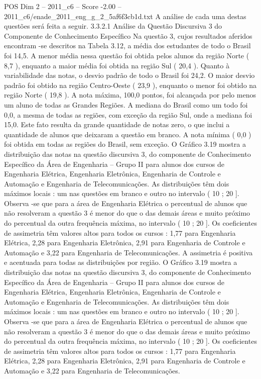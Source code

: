 \begin{textsample}{POS Dim 2 – 2011\_c6 – Score -2.00 – 2011\_c6/enade\_2011\_eng\_g\_2\_5af6f3cb1d.txt}
A análise de cada uma destas questões será feita a seguir. 3.3.2.1 Análise da Questão Discursiva 3 do Componente de Conhecimento Específico Na questão 3, cujos resultados aferidos encontram -se descritos na Tabela 3.12, a média dos estudantes de todo o Brasil foi 14,5.
A menor média nessa questão foi obtida pelos alunos da região Norte ( 8,7 ), enquanto a maior média foi obtida na região Sul ( 20,4 ).
Quanto à variabilidade das notas, o desvio padrão de todo o Brasil foi 24,2.
O maior desvio padrão foi obtido na região Centro-Oeste ( 23,9 ), enquanto o menor foi obtido na região Norte ( 19,8 ).
A nota máxima, 100,0 pontos, foi alcançada por pelo menos um aluno de todas as Grandes Regiões.
A mediana do Brasil como um todo foi 0,0, a mesma de todas as regiões, com exceção da região Sul, onde a mediana foi 15,0.
Este fato resulta da grande quantidade de notas zero, o que inclui a quantidade de alunos que deixaram a questão em branco.
A nota mínima ( 0,0 ) foi obtida em todas as regiões do Brasil, sem exceção.
O Gráfico 3.19 mostra a distribuição das notas na questão discursiva 3, do componente de Conhecimento Específico da Área de Engenharia – Grupo II para alunos dos cursos de Engenharia Elétrica, Engenharia Eletrônica, Engenharia de Controle e Automação e Engenharia de Telecomunicações.
As distribuições têm dois máximos locais : um nas questões em branco e outro no intervalo ( 10 ; 20 ].
Observa -se que para a área de Engenharia Elétrica o percentual de alunos que não resolveram a questão 3 é menor do que o das demais áreas e muito próximo do percentual da outra frequência máxima, no intervalo ( 10 ; 20 ].
Os coeficientes de assimetria têm valores altos para todos os cursos : 1,77 para Engenharia Elétrica, 2,28 para Engenharia Eletrônica, 2,91 para Engenharia de Controle e Automação e 3,22 para Engenharia de Telecomunicações.
A assimetria é positiva e acentuada para todas as distribuições por região.
O Gráfico 3.19 mostra a distribuição das notas na questão discursiva 3, do componente de Conhecimento Específico da Área de Engenharia – Grupo II para alunos dos cursos de Engenharia Elétrica, Engenharia Eletrônica, Engenharia de Controle e Automação e Engenharia de Telecomunicações.
As distribuições têm dois máximos locais : um nas questões em branco e outro no intervalo ( 10 ; 20 ].
Observa -se que para a área de Engenharia Elétrica o percentual de alunos que não resolveram a questão 3 é menor do que o das demais áreas e muito próximo do percentual da outra frequência máxima, no intervalo ( 10 ; 20 ].
Os coeficientes de assimetria têm valores altos para todos os cursos : 1,77 para Engenharia Elétrica, 2,28 para Engenharia Eletrônica, 2,91 para Engenharia de Controle e Automação e 3,22 para Engenharia de Telecomunicações.

\end{textsample}
